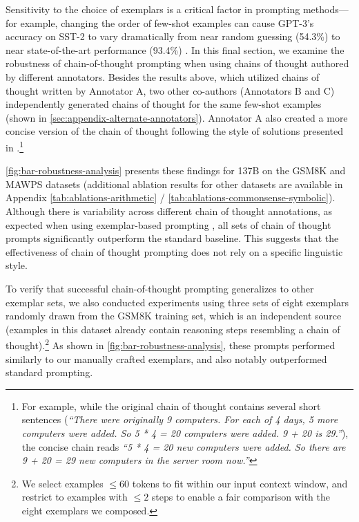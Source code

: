 Sensitivity to the choice of exemplars is a critical factor in prompting methods—for example, changing the order of few-shot examples can cause GPT-3’s accuracy on SST-2 to vary dramatically from near random guessing (54.3\%) to near state-of-the-art performance (93.4\%) \citep{zhao2021calibrate}. In this final section, we examine the robustness of chain-of-thought prompting when using chains of thought authored by different annotators. Besides the results above, which utilized chains of thought written by Annotator A, two other co-authors (Annotators B and C) independently generated chains of thought for the same few-shot examples (shown in \cref{sec:appendix-alternate-annotators}).  
Annotator A also created a more concise version of the chain of thought following the style of solutions presented in \citet{cobbe2021training}.\footnote{For example, while the original chain of thought contains several short sentences (\textit{``There were originally 9 computers. For each of 4 days, 5 more computers were added. So 5 * 4 = 20 computers were added. 9 + 20 is 29.''}), the concise chain reads \textit{``5 * 4 = 20 new computers were added. So there are 9 + 20 = 29 new computers in the server room now.''}}

\cref{fig:bar-robustness-analysis} presents these findings for \lamda{} 137B on the GSM8K and MAWPS datasets (additional ablation results for other datasets are available in Appendix \cref{tab:ablations-arithmetic} / \cref{tab:ablations-commonsense-symbolic}). Although there is variability across different chain of thought annotations, as expected when using exemplar-based prompting \citep{le-scao-rush-2021-many,reynolds2021prompt,zhao2021calibrate}, all sets of chain of thought prompts significantly outperform the standard baseline. This suggests that the effectiveness of chain of thought prompting does not rely on a specific linguistic style.

To verify that successful chain-of-thought prompting generalizes to other exemplar sets, we also conducted experiments using three sets of eight exemplars randomly drawn from the GSM8K training set, which is an independent source (examples in this dataset already contain reasoning steps resembling a chain of thought).\footnote{We select examples $\leq 60$ tokens to fit within our input context window, and restrict to examples with $\leq 2$ steps to enable a fair comparison with the eight exemplars we composed.} As shown in \cref{fig:bar-robustness-analysis}, these prompts performed similarly to our manually crafted exemplars, and also notably outperformed standard prompting.

